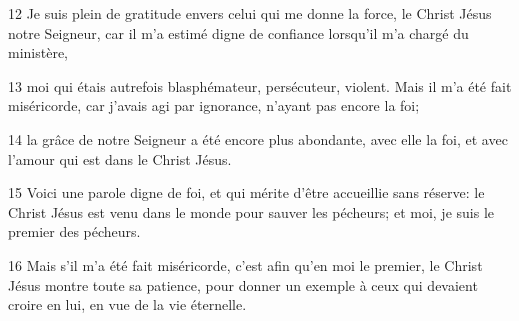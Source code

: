 
12 Je suis plein de gratitude envers celui qui me donne la force, le Christ Jésus notre Seigneur, car il m’a estimé digne de confiance lorsqu’il m’a chargé du ministère,

13 moi qui étais autrefois blasphémateur, persécuteur, violent. Mais il m’a été fait miséricorde, car j’avais agi par ignorance, n’ayant pas encore la foi;

14 la grâce de notre Seigneur a été encore plus abondante, avec elle la foi, et avec l’amour qui est dans le Christ Jésus.

15 Voici une parole digne de foi, et qui mérite d’être accueillie sans réserve: le Christ Jésus est venu dans le monde pour sauver les pécheurs; et moi, je suis le premier des pécheurs.

16 Mais s’il m’a été fait miséricorde, c’est afin qu’en moi le premier, le Christ Jésus montre toute sa patience, pour donner un exemple à ceux qui devaient croire en lui, en vue de la vie éternelle.
